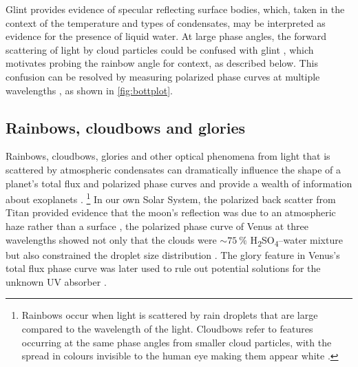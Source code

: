 \documentclass[usenatbib]{mnras}
\begin{document}
Glint provides evidence of specular reflecting surface bodies, which, taken in the context of the temperature and types of condensates, may be interpreted as evidence for the presence of liquid water.
%
At large phase angles, the forward scattering of light by cloud particles could be confused with glint \citep{Robinson_2010}, which motivates probing the rainbow angle for context, as described below.
%
This confusion can be resolved by measuring polarized phase curves at multiple wavelengths %
\citep{treesandstam2019}, as shown in \cref{fig:bottplot}.
%


\subsection{Rainbows, cloudbows and glories}

Rainbows, cloudbows, glories and other optical phenomena from light that is scattered by atmospheric condensates can dramatically influence the shape of a planet's total flux and polarized phase curves and provide a wealth of information about exoplanets \citep{karalidi2012rainbow, stam2008,Bailey2007,2014A&A...566L...1G}.%
\footnote{
    Rainbows occur when light is scattered by rain droplets that are large compared to the wavelength of the light. 
    Cloudbows refer to features occurring at the same phase angles from smaller cloud particles, with the spread in colours invisible to the human eye making them appear white \citep[see][for further discussion]{Bailey2007}.  
}
%
In our own Solar System, the polarized back scatter from Titan provided evidence that the moon's reflection was due to an atmospheric haze rather than a surface \citep{zellner1973polarization}, the polarized phase curve of Venus at three wavelengths showed not only that the clouds were $\sim\qty{75}{\percent}$ H\textsubscript{2}SO\textsubscript{4}--water mixture but also constrained the droplet size distribution \citep{hansenhovenier1974}.
%
The glory feature in Venus's total flux phase curve was later used to rule out potential solutions for the unknown UV absorber \citep{petrova2018glory}.
\end{document}
